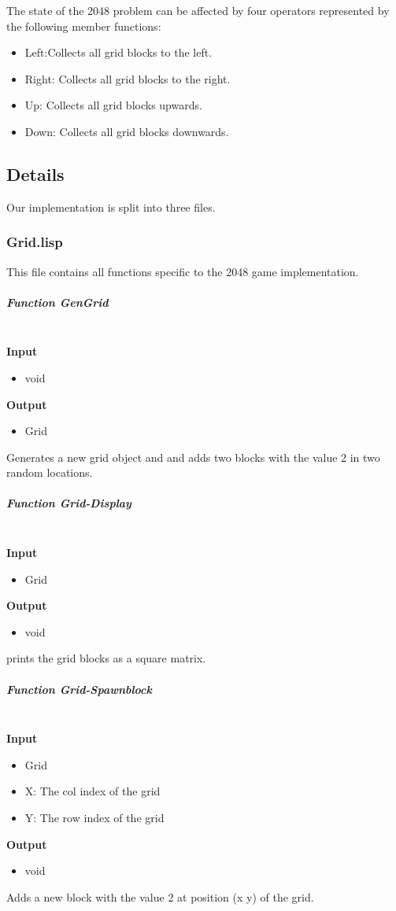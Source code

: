 \documentclass[paper=a4, fontsize=11pt]{scrartcl}
\numberwithin{equation}{section}		%
\numberwithin{figure}{section}			%
\numberwithin{table}{section}				%
\begin{document}
The state of the 2048 problem can be affected by four operators represented by the following member functions:
\begin{itemize}
    \item{Left:}Collects all grid blocks to the left.
    \item{Right:} Collects all grid blocks to the right.
    \item{Up:} Collects all grid blocks upwards.
    \item{Down:} Collects all grid blocks downwards.
\end{itemize}

\subsection{Details}
Our implementation is split into three files.


\subsubsection{Grid.lisp}
This file contains all functions specific to the 2048 game implementation.

\subparagraph{Function GenGrid} \mbox{} \\
\noindent\textbf{Input}
\begin{itemize}
    \item void
\end{itemize}
\noindent\textbf{Output}
\begin{itemize}
    \item{Grid}
\end{itemize}
Generates a new grid object and and adds two blocks with the value 2 in two random locations.


\subparagraph{Function Grid-Display } \mbox{} \\
\noindent\textbf{Input}
\begin{itemize}
    \item Grid
\end{itemize}
\noindent\textbf{Output}
\begin{itemize}
    \item void
\end{itemize}
prints the grid blocks as a square matrix.

\subparagraph{Function Grid-Spawnblock } \mbox{} \\
\noindent\textbf{Input}
\begin{itemize}
    \item Grid
    \item X: The col index of the grid 
    \item Y: The row index of the grid
\end{itemize}
\noindent\textbf{Output}
\begin{itemize}
    \item void
\end{itemize}
Adds a new block with the value 2 at position (x y) of the grid.
\end{document}
